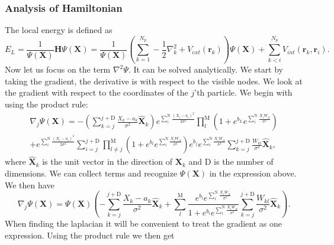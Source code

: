 \subsubsection{Analysis of Hamiltonian}
The local energy is defined as 
\begin{equation*}
E_L = \frac{1}{\Psi(\textbf{X})}\textbf{H}\Psi(\textbf{X}) = \frac{1}{\Psi(\textbf{X})} \left(\sum_{k=1}^{N_p} -\frac{1}{2}\nabla_k^2 + V_{ext}(\mathbf{r}_k)\right)\Psi(\textbf{X})+\sum_{k<i}^{N_p} V_{int}(\mathbf{r}_k,\mathbf{r}_i).
\label{eq_loc_e}
\end{equation*}
Now let us focus on the term $\nabla^2\Psi$. It can be solved analytically. We start by taking the gradient, the derivative is with respect to the visible nodes. We look at the gradient with respect to the coordinates of the $j$'th particle. We begin with using the product rule:
\begin{align*}
\nabla_j\Psi(\textbf{X}) = -\left(\sum_{k=j}^{j+\text{D}}\frac{X_k-a_k}{\sigma^2}\hat{\textbf{X}}_k \right) e^{\sum_i^{\text{N}}\frac{(X_i-a_i)^2}{2\sigma^2}} \prod_l^{\text{M}}\left(1+e^{b_L}e^{\sum_i^{\text{N}}\frac{X_iW_{il}}{\sigma^2}}\right) \\
+ e^{\sum_i^{\text{N}}\frac{(X_i-a_i)^2}{2\sigma^2}} \sum_ {i=j}^{j+\text{D}}\prod_{l\neq j}^{\text{M}} \left(1+e^{b_l}e^{\sum_i^{\text{N}}\frac{X_iW_{il}}{\sigma^2}}\right) e^{b_j}e^{\sum_i^{\text{N}}\frac{X_iW_{il}}{\sigma^2}}\sum_ {k=j}^{j+\text{D}}\frac{W_{kl}}{\sigma^2}\hat{\textbf{X}}_k,
\end{align*}
where $\hat{\textbf{X}}_k$ is the unit vector in the direction of $\textbf{X}_k$ and D is the number of dimensions. We can collect terms and recognize $\Psi(\textbf{X})$ in the expression above. We then have
\begin{equation}
\nabla_j \Psi(\textbf{X}) = \Psi(\textbf{X})\left(  -\sum_{k=j}^{j+\text{D}} \frac{X_k-a_k}{\sigma^2} \hat{\textbf{X}}_k  + \sum_{l}^{\text{M}}\frac{e^{b_l}e^{\sum_{i}^{\text{N}}\frac{X_iW_{il}}{\sigma^2}}}{1+e^{b_l}e^{\sum_{i}^{\text{N}}\frac{X_iW_{il}}{\sigma^2}}}  \sum_{k=j}^{j+\text{D}} \frac{W_{kl}}{\sigma^2} \hat{\textbf{X}}_k    \right).
\label{eq_gradient}
\end{equation}
When finding the laplacian it will be convenient to treat the gradient as one expression. Using the product rule we then get
